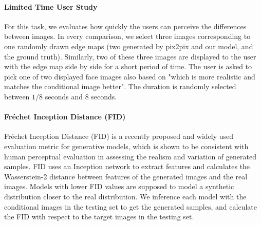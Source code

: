 \paragraph{Limited Time User Study}
For this task, we evaluates how quickly the users can perceive the differences between images. In every comparison, we  select three images corresponding to one randomly drawn edge maps (two generated by pix2pix and our model, and the ground truth). Similarly, two of these three images are displayed to the user with the edge map side by side for a short period of time. The user is asked to pick one of two displayed face images also based on "which is more realistic and matches the conditional image better". The duration is randomly selected between $1/8$ seconds and $8$ seconds. 
\paragraph{Fr\'echet Inception Distance (FID)}
Fr\'echet Inception Distance (FID) \cite{FID} is a recently proposed and widely used evaluation metric for generative models, which is shown to be consistent with human perceptual evaluation in assessing the realism and variation of generated samples. FID uses an Inception network to extract features and calculates the Wasserstein-2 distance between features of the generated images and the real images. Models with lower FID values are supposed to model a synthetic distribution closer to the real distribution. We inference each model with the conditional images in the testing set to get the generated samples, and calculate the FID with respect to the target images in the testing set.
